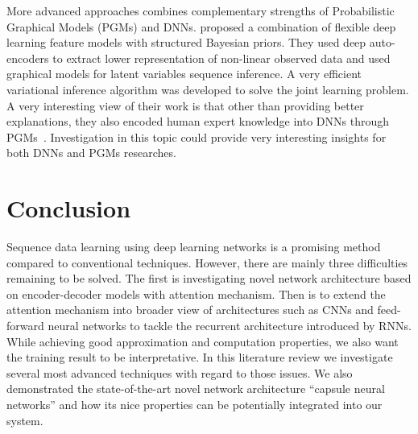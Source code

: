 \documentclass{article} \usepackage{tabularx}
\renewcommand{\citename}{\citet} \renewcommand{\cite}{\citep}
\begin{document}
More advanced approaches combines complementary strengths of
Probabilistic Graphical Models (PGMs) and DNNs.
\citename{johnson2016composing} proposed a combination of
flexible deep learning feature models with structured Bayesian
priors. They used deep auto-encoders to extract lower
representation of non-linear observed data and used graphical
models for latent variables sequence inference. A very efficient
variational inference algorithm was developed to solve the joint
learning problem. A very interesting view of their work is that
other than providing better explanations, they also encoded human
expert knowledge into DNNs through
PGMs~\cite{johnson2016composing}. Investigation in this topic
could provide very interesting insights for both DNNs and PGMs
researches.


\section{Conclusion}
\label{sec:conclu}

Sequence data learning using deep learning networks is a
promising method compared to conventional techniques. However,
there are mainly three difficulties remaining to be solved. The
first is investigating novel network architecture based on
encoder-decoder models with attention mechanism. Then is to
extend the attention mechanism into broader view of architectures
such as CNNs and feed-forward neural networks to tackle the
recurrent architecture introduced by RNNs. While achieving good
approximation and computation properties, we also want the
training result to be interpretative. In this literature review
we investigate several most advanced techniques with regard to
those issues. We also demonstrated the state-of-the-art novel
network architecture ``capsule neural networks'' and how its nice
properties can be potentially integrated into our system.

 
\end{document}
